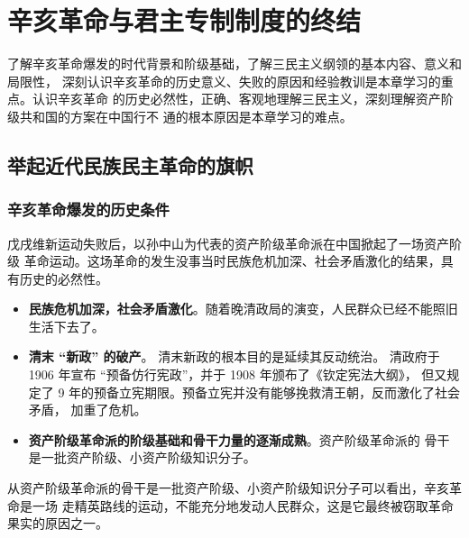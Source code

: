 \documentclass[10pt, UTF8]{ctexbook} %
\begin{document}

\clearpage
\thispagestyle{empty}

\chapter{辛亥革命与君主专制制度的终结}
\thispagestyle{empty}

\quad\quad 
了解辛亥革命爆发的时代背景和阶级基础，了解三民主义纲领的基本内容、意义和局限性，
深刻认识辛亥革命的历史意义、失败的原因和经验教训是本章学习的重点。认识辛亥革命
的历史必然性，正确、客观地理解三民主义，深刻理解资产阶级共和国的方案在中国行不
通的根本原因是本章学习的难点。

\section{举起近代民族民主革命的旗帜}
\subsection{辛亥革命爆发的历史条件}

戊戌维新运动失败后，以孙中山为代表的资产阶级革命派在中国掀起了一场资产阶级
革命运动。这场革命的发生没事当时民族危机加深、社会矛盾激化的结果，具有历史的必然性。
\begin{itemize}[itemsep=0pt]
    \item \textbf{民族危机加深，社会矛盾激化}。随着晚清政局的演变，人民群众已经不能照旧
    生活下去了。
    \item \textbf{清末 “新政” 的破产}。
    清末新政的根本目的是延续其反动统治。
    清政府于 1906 年宣布 “预备仿行宪政”，并于 1908 年颁布了《钦定宪法大纲》，
    但又规定了 9 年的预备立宪期限。预备立宪并没有能够挽救清王朝，反而激化了社会矛盾，
    加重了危机。
    \item \textbf{资产阶级革命派的阶级基础和骨干力量的逐渐成熟}。资产阶级革命派的
    骨干是一批资产阶级、小资产阶级知识分子。
\end{itemize}
\begin{remark}
    从资产阶级革命派的骨干是一批资产阶级、小资产阶级知识分子可以看出，辛亥革命是一场
    走精英路线的运动，不能充分地发动人民群众，这是它最终被窃取革命果实的原因之一。
\end{remark}
\end{document}
